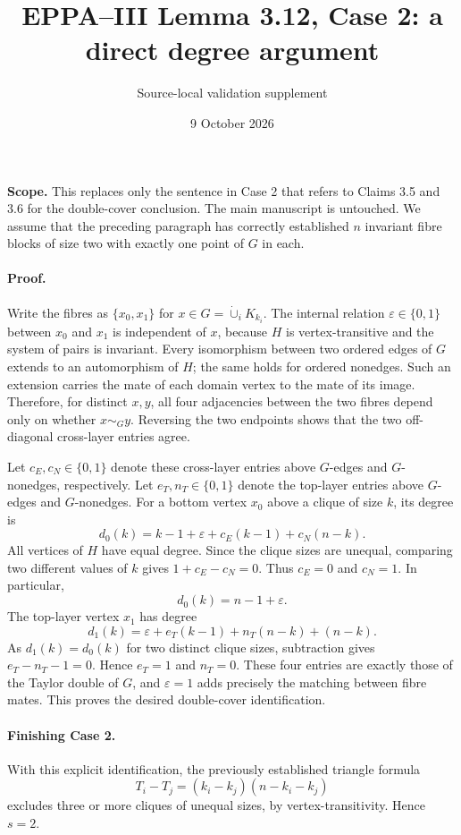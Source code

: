 \documentclass[11pt,a4paper]{article}
\title{EPPA--III Lemma 3.12, Case 2: a direct degree argument}
\author{Source-local validation supplement}
\date{9 October 2026}
\begin{document}
\maketitle

\noindent
\textbf{Scope.} This replaces only the sentence in
Case 2 that refers to Claims 3.5 and 3.6
for the double-cover conclusion. The main manuscript
is untouched. We assume that the preceding paragraph
has correctly established \(n\) invariant fibre blocks
of size two with exactly one point of \(G\) in each.

\paragraph{Proof.}
Write the fibres as \(\{x_0,x_1\}\)
for \(x\in G=\dot\cup_i K_{k_i}\).
The internal relation \(\varepsilon\in\{0,1\}\)
between \(x_0\) and \(x_1\) is independent of
\(x\), because \(H\) is vertex-transitive and
the system of pairs is invariant.
Every isomorphism between two ordered edges of
\(G\) extends to an automorphism of \(H\);
the same holds for ordered nonedges.
Such an extension carries the mate of each
domain vertex to the mate of its image.
Therefore, for distinct \(x,y\), all four
adjacencies between the two fibres depend only
on whether \(x\sim_G y\). Reversing the two
endpoints shows that the two off-diagonal
cross-layer entries agree.

Let \(c_E,c_N\in\{0,1\}\) denote these
cross-layer entries above \(G\)-edges and
\(G\)-nonedges, respectively.
Let \(e_T,n_T\in\{0,1\}\) denote the
top-layer entries above \(G\)-edges and
\(G\)-nonedges. For a bottom vertex \(x_0\)
above a clique of size \(k\), its degree is
\[
 d_0(k)=k-1+\varepsilon+c_E(k-1)+c_N(n-k).
\]
All vertices of \(H\) have equal degree.
Since the clique sizes are unequal, comparing
two different values of \(k\) gives
\(1+c_E-c_N=0\). Thus \(c_E=0\) and
\(c_N=1\). In particular,
\[
                       d_0(k)=n-1+\varepsilon.
\]
The top-layer vertex \(x_1\) has degree
\[
 d_1(k)=\varepsilon+e_T(k-1)+n_T(n-k)+(n-k).
\]
As \(d_1(k)=d_0(k)\) for two distinct
clique sizes, subtraction gives
\(e_T-n_T-1=0\).
Hence \(e_T=1\) and \(n_T=0\).
These four entries are exactly those of
the Taylor double of \(G\), and
\(\varepsilon=1\) adds precisely the
matching between fibre mates.
This proves the desired double-cover
identification.

\paragraph{Finishing Case 2.}
With this explicit identification,
the previously established triangle formula
\[
 T_i-T_j=(k_i-k_j)(n-k_i-k_j)
\]
excludes three or more cliques of unequal sizes,
by vertex-transitivity. Hence \(s=2\).
\end{document}
